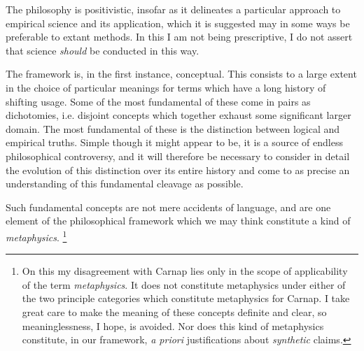 The philosophy is positivistic, insofar as it delineates a particular
approach to empirical science and its application, which it is
suggested may in some ways be preferable to extant methods.
In this I am not being prescriptive, I do not assert that science
\emph{should} be conducted in this way.

The framework is, in the first instance, conceptual.
This consists to a large extent in the choice of particular meanings
for terms which have a long history of shifting usage.
Some of the most fundamental of these come in pairs as dichotomies,
i.e. disjoint concepts which together exhaust some significant larger
domain.
The most fundamental of these is the distinction between logical and
empirical truths.
Simple though it might appear to be, it is a source of endless
philosophical controversy, and it will therefore be necessary to
consider in detail the evolution of this distinction over its entire
history and come to as precise an understanding of this fundamental
cleavage as possible.

Such fundamental concepts are not mere accidents of language, and are
one element of the philosophical framework which we may think
constitute a kind of \emph{metaphysics}.
\footnote{On this my disagreement with Carnap lies only in the scope
  of applicability of the term \emph{metaphysics}.
It does not constitute metaphysics under either of the two principle
categories which constitute metaphysics for Carnap.
I take great care to make the meaning of these concepts definite and
clear, so meaninglessness, I hope, is avoided.
Nor does this kind of metaphysics constitute, in our framework,
\emph{a priori} justifications about \emph{synthetic} claims.
}%
